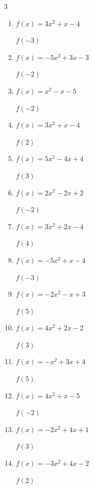 \begin{multicols}{3}
\begin{enumerate}
$f(-2)$
        \phantom{$= -20$}

  \item $f(x)=3x^{2}+x-4$

$f(-3)$
        \phantom{$= 20$}

  \item $f(x)=-5x^{2}+3x-3$

$f(-2)$
        \phantom{$= -29$}

  \item $f(x)=x^{2}-x-5$

$f(-2)$
        \phantom{$= 1$}

  \item $f(x)=3x^{2}+x-4$

$f(2)$
        \phantom{$= 10$}

  \item $f(x)=5x^{2}-4x+4$

$f(3)$
        \phantom{$= 37$}

  \item $f(x)=2x^{2}-2x+2$

$f(-2)$
        \phantom{$= 14$}

  \item $f(x)=3x^{2}+2x-4$

$f(4)$
        \phantom{$= 52$}

  \item $f(x)=-5x^{2}+x-4$

$f(-3)$
        \phantom{$= -52$}

  \item $f(x)=-2x^{2}-x+3$

$f(5)$
        \phantom{$= -52$}

  \item $f(x)=4x^{2}+2x-2$

$f(3)$
        \phantom{$= 40$}

  \item $f(x)=-x^{2}+3x+4$

$f(5)$
        \phantom{$= -6$}

  \item $f(x)=4x^{2}+x-5$

$f(-2)$
        \phantom{$= 9$}

  \item $f(x)=-2x^{2}+4x+1$

$f(3)$
        \phantom{$= -5$}

  \item $f(x)=-3x^{2}+4x-2$

$f(2)$
        \phantom{$= -6$}


\end{enumerate}
\end{multicols}
